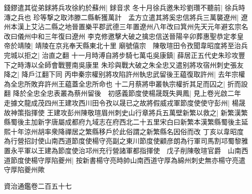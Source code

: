 錢鏐遣其從弟銶將兵攻徐約於蘇州|{
	銶音求}
冬十月徐兵邀朱珍劉瓚不聽前|{
	徐兵時漙之兵也}
珍等撃之取沛滕二縣斬獲萬計　孟方立遣其將奚忠信將兵三萬襲遼州|{
	遼州本漢上艾沾二縣之地晉置樂平郡武德三年置遼州八年改曰箕州先天元年避玄宗名改曰儀州中和三年復曰遼州}
李克修邀擊大破之擒忠信送晉陽辛卯葬惠聖恭定孝皇帝於靖陵|{
	靖陵在京兆奉天縣東北十里}
廟號僖宗　陳敬瑄田令孜聞韋昭度將至治兵完城以拒之|{
	治直之翻}
十一月時溥自將步騎七萬屯吳康鎮|{
	薛居正五代史朱珍攻豐下之時漙以全師會戰豐南吳康里}
朱珍與戰大破之朱全忠又遣别將攻宿州刺史張友降之|{
	降戶江翻下同}
丙申秦宗權别將攻陷許州執忠武留後王藴復取許州|{
	去年宗權為全忠所敗弃許州王藴蓋全忠所命也}
十二月蔡將申叢執宗權折其足而囚之|{
	折而設翻}
降於全忠全忠表叢為蔡州留後　初感義節度使楊晟既失興鳳|{
	見上卷光啟二年}
走據文龍成茂四州王建攻西川田令孜以晟已之故將假威戎軍節度使使守彭州|{
	楊晟故神策指揮使}
王建攻彭州陳敬瑄眉州刺史山行章將兵五萬壁新繁以救之|{
	新繁漢繁縣蜀後主加新字唐屬成都府九域志在府西北二十五里宋白曰新繁本漢繁縣蜀後主延熙十年涼州胡率衆降禪居之繁縣移戶於此俗謂之新繁縣名因俗而改}
丁亥以韋昭度為行營招討使山南西道節度使楊守亮副之東川節度使顧彦朗為行軍司馬割邛蜀黎雅置永平軍以王建為節度使治邛州充行營諸軍都指揮使　戊子削陳敬瑄官爵　山南西道節度使楊守厚陷夔州|{
	按新書楊守亮時帥山南西道守厚為綿州刺史無亦楊守亮遣守厚陷夔州歟}


資治通鑑卷二百五十七
